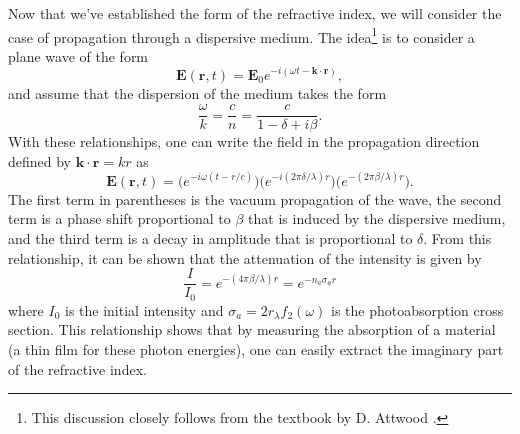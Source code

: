 Now that we've established the form of the refractive index, we will consider the case of propagation through a dispersive medium. The idea\footnote{This discussion closely follows from the textbook by D. Attwood \cite{attwoodSoftXraysExtreme2000}.} is to consider a plane wave of the form
\begin{equation}
	\mathbf{E}(\mathbf{r},t)=\mathbf{E}_0e^{-i(\omega t - \mathbf{k}\cdot\mathbf{r})},
\end{equation}
and assume that the dispersion of the medium takes the form
\begin{equation}
	\frac{\omega}{k}=\frac{c}{n}=\frac{c}{1-\delta+i\beta}.
\end{equation}
With these relationships, one can write the field in the propagation direction defined by $\mathbf{k}\cdot\mathbf{r}=kr$ as
\begin{equation}
	\mathbf{E}(\mathbf{r},t)=\big(e^{-i\omega(t - r/c)}\big) \big(e^{-i(2\pi\delta/\lambda)r}\big) \big(e^{-(2\pi\beta/\lambda)r}\big).
\end{equation}
The first term in parentheses is the vacuum propagation of the wave, the second term is a phase shift proportional to $\beta$ that is induced by the dispersive medium, and the third term is a decay in amplitude that is proportional to $\delta$.  From this relationship, it can be shown that the attenuation of the intensity is given by 
\begin{equation}
\label{eqn:beer-lambert}
	\frac{I}{I_0}=e^{-(4\pi\beta/\lambda)r}=e^{-n_a \sigma_a r}
\end{equation}
where $I_0$ is the initial intensity and $\sigma_a=2r_\lambda f_2(\omega)$ is the photoabsorption cross section.  This relationship shows that by measuring the absorption of a material (a thin film for these photon energies), one can easily extract the imaginary part of the refractive index.

